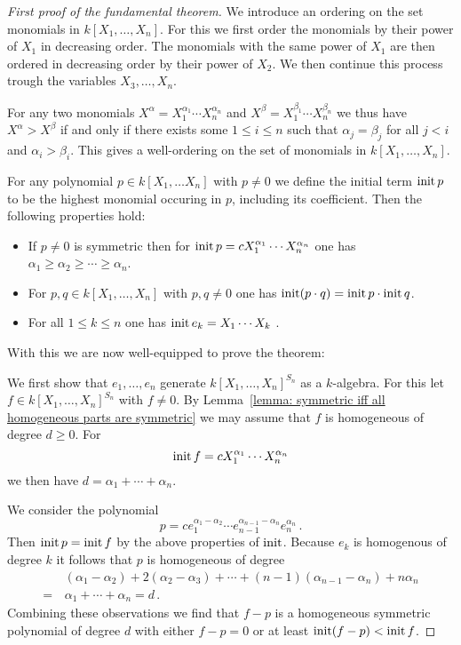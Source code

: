 \begin{proof}[First proof of the fundamental theorem]
  \label{label: first proof of fundamental theorem}
  We introduce an ordering on the set monomials in $k[X_1, \dotsc, X_n]$.
  For this we first order the monomials by their power of $X_1$ in decreasing order.
  The monomials with the same power of $X_1$ are then ordered in decreasing order by their power of $X_2$.
  We then continue this process trough the variables $X_3, \dotsc, X_n$.
  
  For any two monomials $X^\alpha = X_1^{\alpha_1} \dotsm X_n^{\alpha_n}$ and $X^\beta = X_1^{\beta_1} \dotsm X_n^{\beta_n}$ we thus have $X^\alpha > X^\beta$ if and only if there exists some $1 \leq i \leq n$ such that $\alpha_j = \beta_j$ for all $j < i$ and $\alpha_i > \beta_i$.
  This gives a well-ordering on the set of monomials in $k[X_1, \dotsc, X_n]$.
  
  For any polynomial $p \in k[X_1, \dotsc X_n]$ with $p \neq 0$ we define the initial term $\operatorname{init} p$ to be the highest monomial occuring in $p$, including its coefficient.
  Then the following properties hold:
  \begin{itemize}
    \item
      If $p \neq 0$ is symmetric then for $\operatorname{init} p = c X_1^{\alpha_1} \dotsm X_n^{\alpha_n}$ one has $\alpha_1 \geq \alpha_2 \geq \dotsb \geq \alpha_n$.
    \item
      For $p, q \in k[X_1, \dotsc, X_n]$ with $p, q \neq 0$ one has $\operatorname{init} (p \cdot q) = \operatorname{init} p \cdot \operatorname{init} q$.
    \item
      For all $1 \leq k \leq n$ one has $\operatorname{init} e_k = X_1 \dotsm X_k$ .
  \end{itemize}
  With this we are now well-equipped to prove the theorem:
  
  We first show that $e_1, \dotsc, e_n$ generate $k[X_1, \dotsc, X_n]^{S_n}$ as a $k$-algebra.
  For this let $f \in k[X_1, \dotsc, X_n]^{S_n}$ with $f \neq 0$.
  By Lemma~\ref{lemma: symmetric iff all homogeneous parts are symmetric} we may assume that $f$ is homogeneous of degree $d \geq 0$.
  For
  \[
      \operatorname{init} f
    = c X_1^{\alpha_1} \dotsm X_n^{\alpha_n}
  \]
  we then have $d = \alpha_1 + \dotsb + \alpha_n$.
  
  We consider the polynomial
  \[
      p
    =         c
              e_1^{\alpha_1 - \alpha_2}
      \dotsm  e_{n-1}^{\alpha_{n-1} - \alpha_n}
              e_n^{\alpha_n} \,.
  \]
  Then $\operatorname{init} p = \operatorname{init} f$ by the above properties of $\operatorname{init}$.
  Because $e_k$ is homogenous of degree $k$ it follows that $p$ is homogeneous of degree
  \begin{align*}
     &\,  (\alpha_1-\alpha_2) + 2(\alpha_2-\alpha_3) + \dotsb + (n-1)(\alpha_{n-1}-\alpha_n) + n\alpha_n \\
    =&\,  \alpha_1 + \dotsb + \alpha_n
    =     d \,.
  \end{align*}
  Combining these observations we find that $f-p$ is a homogeneous symmetric polynomial of degree $d$ with either $f-p = 0$ or at least $\operatorname{init} (f-p) < \operatorname{init} f$.
  

\end{proof}
